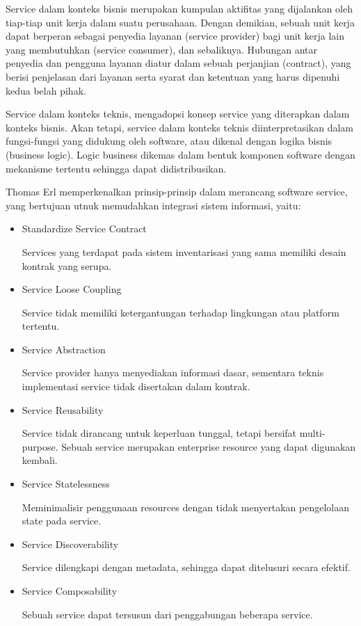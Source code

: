 Service dalam konteks bisnis merupakan kumpulan aktifitas yang dijalankan oleh tiap-tiap unit kerja dalam suatu perusahaan. Dengan demikian, sebuah unit kerja dapat berperan sebagai penyedia layanan (service provider) bagi unit kerja lain yang membutuhkan (service consumer), dan sebaliknya. Hubungan antar penyedia dan pengguna layanan diatur dalam sebuah perjanjian (contract), yang berisi penjelasan dari layanan serta syarat dan ketentuan yang harus dipenuhi kedua belah pihak.

Service dalam konteks teknis, mengadopsi konsep service yang diterapkan dalam konteks bisnis. Akan tetapi, service dalam konteks teknis diinterpretasikan dalam fungsi-fungsi yang didukung oleh software, atau dikenal dengan logika bisnis (business logic). Logic business dikemas dalam bentuk komponen software dengan mekanisme tertentu sehingga dapat didistribusikan.

Thomas Erl memperkenalkan prinsip-prinsip dalam merancang software service, yang bertujuan utnuk memudahkan integrasi sistem informasi, yaitu:
\begin{itemize}
\item Standardize Service Contract

Services yang terdapat pada sistem inventarisasi yang sama memiliki desain kontrak yang serupa.
\item Service Loose Coupling

Service tidak memiliki ketergantungan terhadap lingkungan atau platform tertentu.
\item Service Abstraction

Service provider hanya menyediakan informasi dasar, sementara teknis implementasi service tidak disertakan dalam kontrak.
\item Service Reusability

Service tidak dirancang untuk keperluan tunggal, tetapi bersifat multi-purpose. Sebuah service merupakan enterprise resource yang dapat digunakan kembali.
\item Service Statelessness

Meminimalisir penggunaan resources dengan tidak menyertakan pengelolaan state pada service.
\item Service Discoverability

Service dilengkapi dengan metadata, sehingga dapat ditelusuri secara efektif.
\item Service Composability

Sebuah service dapat tersusun dari penggabungan beberapa service.
\end{itemize}

